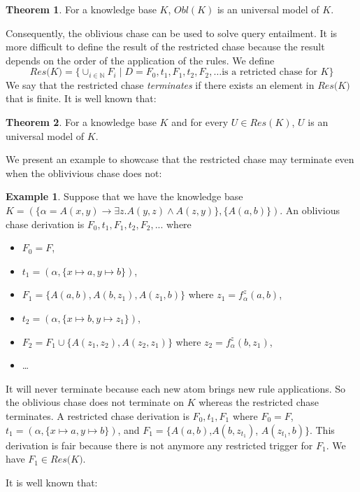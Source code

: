 \documentclass{article}
\theoremstyle{definition}
\newtheorem{theorem}{Theorem}[section]
\newtheorem{example}{Example}[section]
\theoremstyle{remark}
\def \N {\mathbb N}
\begin{document}
\begin{theorem}
For a knowledge base $K$, $\textit{Obl}(K)$ is an universal model of $K$.
\end{theorem}

Consequently, the oblivious chase can be used to solve query entailment. It is more difficult to define the result of the restricted chase because the result depends on the order of the application of the rules. We define $$\textit{Res(K)}=\{\cup_{i \in \N}F_i \mid D = F_0,t_1,F_1,t_2,F_2,\ldots \text{is a retricted chase for } K\}$$ We say that the restricted chase \emph{terminates} if there exists an element in $\textit{Res(K)}$ that is finite. It is well known that:

\begin{theorem}
For a knowledge base $K$ and for every $U \in \textit{Res}(K)$, $U$ is an universal model of $K$.
\end{theorem}

We present an example to showcase that the restricted chase may terminate even when the oblivivious chase does not:
\begin{example}
Suppose that we have the knowledge base $K=(\{\alpha  = A(x,y) \rightarrow \exists z.A(y,z) \wedge A(z,y)\},\{A(a,b)\})$. An oblivious chase derivation is $F_0,t_1,F_1,t_2,F_2,...$ where
\begin{itemize}
\item $F_0 = F$, 
\item $t_1=(\alpha,\{x \mapsto a, y \mapsto b\})$, 
\item $F_1=\{A(a,b),A(b,z_1),A(z_1,b)\}$ where $z_1 =f_\alpha^z(a,b)$,
\item $t_2=(\alpha,\{x \mapsto b, y \mapsto z_1\})$, 
\item $F_2=F_1 \cup \{ A(z_1,z_2), A(z_2,z_1)\}$ where $z_2= f_\alpha^z(b,z_1)$, 
\item \ldots\ 
\end{itemize} 
It will never terminate because each new atom brings new rule applications. So the oblivious chase does not terminate on $K$ whereas the restricted chase terminates. A restricted chase derivation is $F_0,t_1,F_1$ where $F_0 = F$, $t_1=(\alpha,\{x \mapsto a, y \mapsto b\})$, and $F_1=\{A(a,b)$,$A(b,z_{t_1})$, $A(z_{t_1},b)\}$. This derivation is fair because there is not anymore any restricted trigger for $F_1$. We have $F_1 \in \textit{Res(K)}$.
\end{example}


It is well known that:
\end{document}

